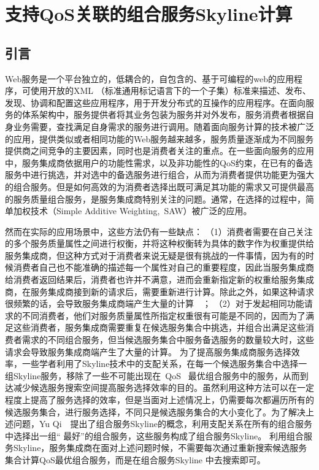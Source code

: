 \chapter{支持QoS关联的组合服务Skyline计算}

\section{引言}

Web服务是一个平台独立的，低耦合的，自包含的、基于可编程的web的应用程序，可使用开放的XML （标准通用标记语言下的一个子集）标准来描述、发布、发现、协调和配置这些应用程序，用于开发分布式的互操作的应用程序。在面向服务的体系架构中，服务提供者将其业务包装为服务并对外发布，服务消费者根据自身业务需要，查找满足自身需求的服务进行调用。随着面向服务计算的技术被广泛的应用，提供类似或者相同功能的Web服务越来越多，服务质量逐渐成为不同服务提供商之间竞争的主要因素，同时也是消费者关注的重点。在一些面向服务的应用中，服务集成商依据用户的功能性需求，以及非功能性的QoS约束，在已有的备选服务中进行挑选，并对选中的备选服务进行组合，从而为消费者提供功能更为强大的组合服务。但是如何高效的为消费者选择出既可满足其功能的需求又可提供最高的服务质量组合服务，是服务集成商特别关注的问题。通常，在选择的过程中，简单加权技术（Simple Additive Weighting,~SAW）被广泛的应用。

然而在实际的应用场景中，这些方法仍有一些缺点：
（1）消费者需要在自己关注的多个服务质量属性之间进行权衡，并将这种权衡转为具体的数字作为权重提供给服务集成商，但这种方式对于消费者来说无疑是很有挑战的一件事情，因为有的时候消费者自己也不能准确的描述每一个属性对自己的重要程度，因此当服务集成商给消费者返回结果后，消费者也许并不满意，进而会重新指定新的权重给服务集成商，在服务集成商接到新的请求后，需要重新进行计算。除此之外，如果这种请求很频繁的话，会导致服务集成商端产生大量的计算~\cite{yu2013efficient}~；
（2）对于发起相同功能请求的不同消费者，他们对服务质量属性所指定权重很有可能是不同的，因而为了满足这些消费者，服务集成商需要重复在候选服务集合中挑选，并组合出满足这些消费者需求的不同组合服务，但当候选服务集合中服务备选服务的数量较大时，这些请求会导致服务集成商端产生了大量的计算。
为了提高服务集成商服务选择效率，一些学者利用了Skyline技术中的支配关系，在每一个候选服务集合中选择一组Skyline服务，移除了一些不可能出现在~QoS~ 最优组合服务中的服务，从而到达减少候选服务搜索空间提高服务选择效率的目的。虽然利用这种方法可以在一定程度上提高了服务选择的效率，但是当面对上述情况上，仍需要每次都遍历所有的候选服务集合，进行服务选择，不同只是候选服务集合的大小变化了。为了解决上述问题，Yu Qi~\cite{yu2013efficient}~提出了组合服务Skyline的概念，利用支配关系在所有的组合服务中选择出一组`` 最好''的组合服务，这些服务构成了组合服务Skyline。 利用组合服务Skyline，服务集成商在面对上述问题时候，不需要每次通过重新搜索候选服务集合计算QoS最优组合服务，而是在组合服务Skyline 中去搜索即可。


